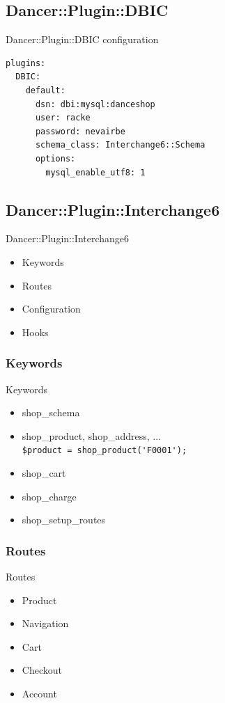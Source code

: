 \subsection{Dancer::Plugin::DBIC}
\begin{frame}[fragile]{Dancer::Plugin::DBIC configuration}
\begin{lstlisting}
plugins:
  DBIC:
    default:
      dsn: dbi:mysql:danceshop
      user: racke
      password: nevairbe
      schema_class: Interchange6::Schema
      options:
        mysql_enable_utf8: 1
\end{lstlisting}
\end{frame}

\subsection{Dancer::Plugin::Interchange6}
\begin{frame}{Dancer::Plugin::Interchange6}
\begin{itemize}
\item Keywords
\item Routes
\item Configuration
\item Hooks
\end{itemize}
\end{frame}

\subsubsection{Keywords}
\begin{frame}[fragile]{Keywords}
\begin{itemize}
\item shop\_schema
\item shop\_product, shop\_address, ...\\
\verb|$product = shop_product('F0001');|
\item shop\_cart
\item shop\_charge
\item shop\_setup\_routes
\end{itemize}
\end{frame}

\subsubsection{Routes}
\begin{frame}{Routes}
\begin{itemize}
\item Product
\item Navigation
\item Cart
\item Checkout
\item Account
\end{itemize}
\end{frame}


